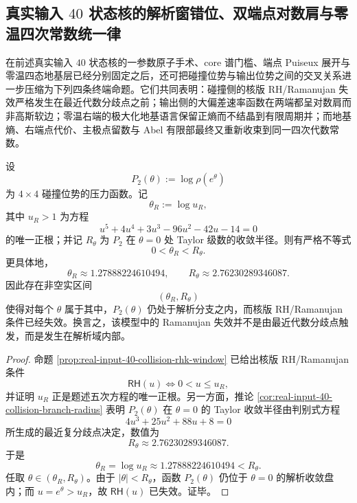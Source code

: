 \subsection{真实输入 \texorpdfstring{$40$}{40} 状态核的解析窗错位、双端点对数肩与零温四次常数统一律}\label{subsec:conclusion-realinput40-analytic-window-logshoulder-ground-quartic-unification}
在前述真实输入 \(40\) 状态核的一参数原子手术、core 谱门槛、端点 Puiseux 展开与零温四态地基层已经分别固定之后，还可把碰撞位势与输出位势之间的交叉关系进一步压缩为下列四条终端命题。它们共同表明：碰撞侧的核版 RH/Ramanujan 失效严格发生在最近代数分歧点之前；输出侧的大偏差速率函数在两端都呈对数肩而非高斯软边；零温右端的极大化地基语言保留正熵而不结晶到有限周期并；而地基熵、右端点代价、主极点留数与 Abel 有限部最终又重新收束到同一四次代数常数。

\begin{theorem}[谱障碍严格先于代数分歧]\label{thm:conclusion-realinput40-spectral-obstruction-before-algebraic-branch}
设
\[
P_2(\theta):=\log \rho(e^\theta)
\]
为 \(4\times 4\) 碰撞位势的压力函数。记
\[
\theta_R:=\log u_R,
\]
其中 \(u_R>1\) 为方程
\[
u^5+4u^4+3u^3-96u^2-42u-14=0
\]
的唯一正根；并记 \(R_\theta\) 为 \(P_2\) 在 \(\theta=0\) 处 Taylor 级数的收敛半径。则有严格不等式
\[
0<\theta_R<R_\theta.
\]
更具体地，
\[
\theta_R\approx 1.27888224610494,
\qquad
R_\theta\approx 2.76230289346087.
\]
因此存在非空实区间
\[
(\theta_R,R_\theta)
\]
使得对每个 \(\theta\) 属于其中，\(P_2(\theta)\) 仍处于解析分支之内，而核版 RH/Ramanujan 条件已经失效。换言之，该模型中的 Ramanujan 失效并不是由最近代数分歧点触发，而是发生在解析域内部。
\end{theorem}
\begin{proof}
命题 \ref{prop:real-input-40-collision-rhk-window} 已给出核版 RH/Ramanujan 条件
\[
\textsf{RH}(u)\Longleftrightarrow 0<u\le u_R,
\]
并证明 \(u_R\) 正是题述五次方程的唯一正根。另一方面，推论 \ref{cor:real-input-40-collision-branch-radius} 表明 \(P_2(\theta)\) 在 \(\theta=0\) 的 Taylor 收敛半径由判别式方程
\[
4u^3+25u^2+88u+8=0
\]
所生成的最近复分歧点决定，数值为
\[
R_\theta\approx 2.76230289346087.
\]
于是
\[
\theta_R=\log u_R\approx 1.27888224610494<R_\theta.
\]
任取 \(\theta\in(\theta_R,R_\theta)\)。由于 \(|\theta|<R_\theta\)，函数 \(P_2(\theta)\) 仍位于 \(\theta=0\) 的解析收敛盘内；而 \(u=e^\theta>u_R\)，故 \(\textsf{RH}(u)\) 已失效。证毕。
\end{proof}

